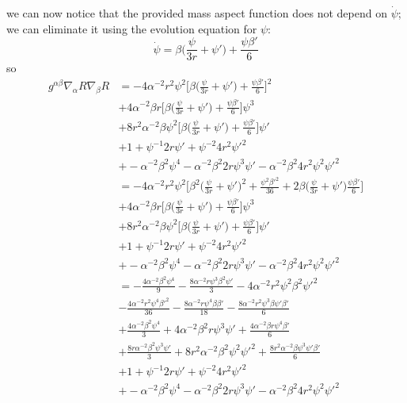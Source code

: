 \documentclass[12pt]{article}
\numberwithin{equation}{section}
\begin{document}
we can now notice that the provided mass aspect function does not depend on $\dot{\psi}$; we can eliminate it using the evolution equation for $\psi$:
\begin{equation}
\dot{\psi} = \beta \Big( \frac{\psi}{3 r} + \psi' \Big) + \frac{\psi \beta'}{6}
\end{equation}
so
\begin{equation}
\begin{aligned}
g^{\alpha \beta} \nabla_\alpha R \nabla_\beta R &= -4 \alpha^{-2} r^2 \psi^2 \Big[ \beta \Big( \frac{\psi}{3 r} + \psi' \Big) + \frac{\psi \beta'}{6} \Big]^2 \\
&+ 4 \alpha^{-2} \beta r \Big[ \beta \Big( \frac{\psi}{3 r} + \psi' \Big) + \frac{\psi \beta'}{6} \Big] \psi^3 \\
&+ 8 r^2 \alpha^{-2} \beta \psi^2 \Big[ \beta \Big( \frac{\psi}{3 r} + \psi' \Big) + \frac{\psi \beta'}{6} \Big] \psi' \\
&+ 1 + \psi^{-1} 2 r \psi' + \psi^{-2} 4 r^2 \psi'^2 \\
&+ -\alpha^{-2} \beta^2 \psi^4 - \alpha^{-2} \beta^2 2 r \psi^3 \psi' - \alpha^{-2} \beta^2 4 r^2 \psi^2 \psi'^2 \\
&= -4 \alpha^{-2} r^2 \psi^2 \Big[ \beta^2 \Big( \frac{\psi}{3 r} + \psi' \Big)^2 + \frac{\psi^2 \beta'^2}{36} + 2 \beta \Big(\frac{\psi}{3r} + \psi'\Big) \frac{\psi \beta'}{6} \Big] \\
&+ 4 \alpha^{-2} \beta r \Big[ \beta \Big( \frac{\psi}{3 r} + \psi' \Big) + \frac{\psi \beta'}{6} \Big] \psi^3 \\
&+ 8 r^2 \alpha^{-2} \beta \psi^2 \Big[ \beta \Big( \frac{\psi}{3 r} + \psi' \Big) + \frac{\psi \beta'}{6} \Big] \psi' \\
&+ 1 + \psi^{-1} 2 r \psi' + \psi^{-2} 4 r^2 \psi'^2 \\
&+ -\alpha^{-2} \beta^2 \psi^4 - \alpha^{-2} \beta^2 2 r \psi^3 \psi' - \alpha^{-2} \beta^2 4 r^2 \psi^2 \psi'^2 \\
&= - \frac{4 \alpha^{-2} \beta^2 \psi^4}{9} - \frac{8 \alpha^{-2} r \psi^3 \beta^2  \psi'}{3} - 4 \alpha^{-2} r^2 \psi^2 \beta^2 \psi'^2  \\
&- \frac{4 \alpha^{-2} r^2 \psi^4 \beta'^2}{36} - \frac{8 \alpha^{-2} r \psi^4 \beta \beta'}{18} - \frac{8 \alpha^{-2} r^2 \psi^3 \beta \psi' \beta'}{6} \\
&+ \frac{4 \alpha^{-2} \beta^2 \psi^4}{3} + 4 \alpha^{-2} \beta^2 r \psi^3 \psi' + \frac{4 \alpha^{-2} \beta r \psi^4 \beta'}{6}   \\
&+ \frac{8 r \alpha^{-2} \beta^2 \psi^3 \psi'}{3} + 8 r^2 \alpha^{-2} \beta^2 \psi^2 \psi'^2 + \frac{8 r^2 \alpha^{-2} \beta \psi^3 \psi' \beta'}{6} \\
&+ 1 + \psi^{-1} 2 r \psi' + \psi^{-2} 4 r^2 \psi'^2 \\
&+ -\alpha^{-2} \beta^2 \psi^4 - \alpha^{-2} \beta^2 2 r \psi^3 \psi' - \alpha^{-2} \beta^2 4 r^2 \psi^2 \psi'^2 \\
\end{aligned}
\end{equation}
\end{document}

